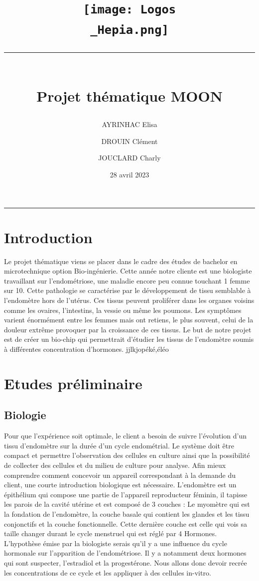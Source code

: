 \documentclass[a4paper, 11pt]{article}
\title{
    \vspace{-2.5cm}
    \centering\texttt{[image: Logos\\\_Hepia.png]}\\
    \centering\rule{17cm}{0.1mm}\vspace*{0.4in}\\
    \centering Projet thématique MOON}
\author[1]{AYRINHAC Elisa}
\author[2]{DROUIN Clément}
\author[3]{JOUCLARD Charly}
\affil[1]{HEPIA, MT2, elisa.ayrinhac@hes-so.ch}
\affil[2]{HEPIA, MT2, clement.drouin@hes-so.ch}
\affil[3]{HEPIA, MT2, charly.jouclard@hes-so.ch}
\date{28 avril 2023}
\begin{document}
\maketitle
\thispagestyle{empty}
\begin{center}
    \rule{\textwidth}{0.1mm}
\end{center}
\vspace{-1cm}
\section*{Introduction}
Le projet thématique viens se placer dans le cadre des études de bachelor en microtechnique option Bio-ingénierie.
Cette année notre cliente est une biologiste travaillant sur l'endométriose, une maladie encore peu connue touchant 1 femme sur 10.
Cette pathologie se caractérise par le développement de tissu semblable à l'endomètre hors de l'utérus.
Ces tissus peuvent proliférer dans les organes voisins comme les ovaires, l'intestins, la vessie ou même les poumons.
Les symptômes varient énormément entre les femmes mais ont retiens, le plus souvent, celui de la douleur extrême provoquer par la croissance de ces tissus.
Le but de notre projet est de créer un bio-chip qui permettrait d'étudier les tissus de l'endomètre soumis à différentes concentration d'hormones.
jjlkjopéké,éléo
\newpage
\tableofcontents
\newpage
\section{Etudes préliminaire}
\subsection{Biologie}
Pour que l'expérience soit optimale, le client a besoin de suivre l'évolution d'un tissu d'endomètre sur la durée d'un cycle endométrial.
Le système doit être compact et permettre l'observation des cellules en culture ainsi que la possibilité de collecter des cellules et du milieu de culture pour analyse.
Afin mieux comprendre comment concevoir un appareil correspondant à la demande du client, une courte introduction biologique est nécessaire.
L'endomètre est un épithélium qui compose une partie de l'appareil reproducteur féminin, il tapisse les parois de la cavité utérine et est composé de 3 couches :
Le myomètre qui est la fondation de l'endomètre, la couche basale qui contient les glandes et les tissu conjonctifs et la couche fonctionnelle.
Cette dernière couche est celle qui vois sa taille changer durant le cycle menstruel qui est réglé par 4 Hormones.
L'hypothèse émise par la biologiste serais qu'il y a une influence du cycle hormonale sur l'apparition de l'endométriose.
Il y a notamment deux hormones qui sont suspecter, l'estradiol et la progestérone.
Nous allons donc devoir recrée les concentrations de ce cycle et les appliquer à des cellules in-vitro.
\end{document}
